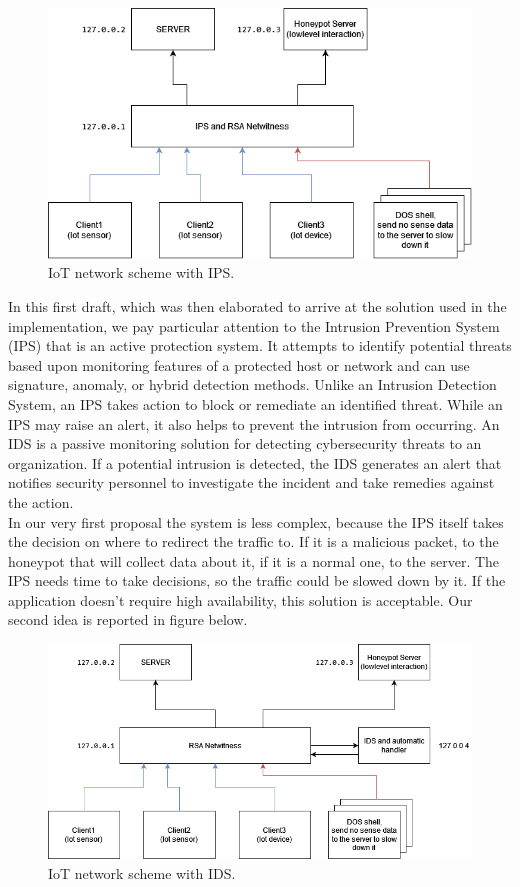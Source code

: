 \begin{figure}[h!]
  \centering
  \includegraphics[width = 15cm]{images/IOTIPS.drawio.png}
  \caption{IoT network scheme with IPS.}
  \label{fig:2period}
\end{figure}
\FloatBarrier
In this first draft, which was then elaborated to arrive at the solution used in the implementation, we pay particular attention to the  Intrusion Prevention System (IPS) that is an active protection system. It attempts to identify potential threats based upon monitoring features of a protected host or network and can use signature, anomaly, or hybrid detection methods. Unlike an Intrusion Detection System, an IPS takes action to block or remediate an identified threat. While an IPS may raise an alert, it also helps to prevent the intrusion from occurring. An IDS is a passive monitoring solution for detecting cybersecurity threats to an organization. If a potential intrusion is detected, the IDS generates an alert that notifies security personnel to investigate the incident and take remedies against the action. \\
In our very first proposal the system is less complex, because the IPS itself takes the decision on where to redirect the traffic to. If it is a malicious packet, to the honeypot that will collect data about it, if it is a normal one, to the server. The IPS needs time to take decisions, so the traffic could be slowed down by it. If the application doesn't require high availability, this solution is acceptable.
Our second idea is reported in figure below.

\begin{figure}[h!]
  \centering
  \includegraphics[width = 15cm]{images/IOTIDS.drawio.png}
  \caption{IoT network scheme with IDS.}
  \label{fig:1period}
\end{figure}
\FloatBarrier

